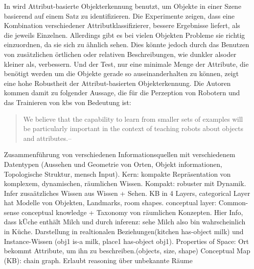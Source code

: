 In \cite{atrBasedObjIden} wird Attribut-basierte Objekterkennung benutzt, um Objekte in einer Szene basierend auf einem Satz zu identifizieren. Die Experimente zeigen, dass eine Kombination verschiedener Attributklassifizierer, bessere Ergebnisse liefert, als die jeweils Einzelnen. Allerdings gibt es bei vielen Objekten Probleme sie richtig einzuordnen, da sie sich zu ähnlich sehen. Dies könnte jedoch durch das Benutzen von zusätzlichen örtlichen oder relativen Beschreibungen, wie \glqq dunkler als\grqq \space oder \glqq kleiner als\grqq, verbessern. Und der Test, nur eine minimale Menge der Attribute, die benötigt werden um die Objekte gerade so auseinanderhalten zu können, zeigt eine hohe Robustheit der Attribut-basierten Objekterkennung. Die Autoren kommen damit zu folgender Aussage, die für die Perzeption von Robotern und das Trainieren von \glspl{kb} von Bedeutung ist: 
\begin{quote}
\glqq We believe that the capability to learn from smaller sets
of examples will be particularly important in the context of
teaching robots about objects and attributes.\grqq \hfill -- \cite{atrBasedObjIden}
\end{quote}

\cite{pronobis1} \newline
Zusammenführung von verschiedenen Informationsquellen mit verschiedenem Datentypen (Aussehen und Geometrie von Orten, Objekt informationen, Topologische Struktur, mensch Input). Kern: kompakte Repräsentation von komplexem, dynamischen, räumlichen Wissen. \newline
Kompakt: robuster mit Dynamik. \newline
Infer zusaätzliches Wissen aus Wissen + Sehen. \newline
KB in 4 Layers, categorical Layer hat Modelle von Objekten, Landmarks, room shapes. \newline
conceptual layer: Common-sense conceptual knowledge + Taxonomy von räumlichen Konzepten. Hier Info, dass kÜche enthält Milch und durch inferenz: sehe Milch also bin wahrscheinlich in Küche. Darstellung in realtionalen Beziehungen(kitchen has-object milk) und Instance-Wissen (obj1 is-a milk, place1 has-object obj1).\newline
Properties of Space: Ort bekommt Attribute, um ihn zu beschreiben.(objects, size, shape) \newline
Conceptual Map (KB): chain graph. Erlaubt reasoning über unbekannte Räume







